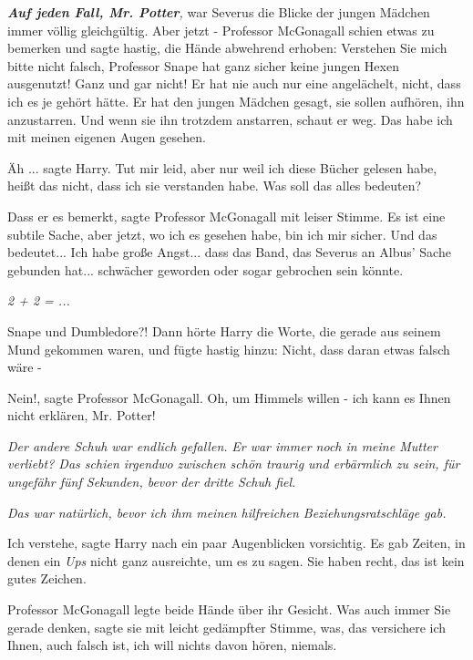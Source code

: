 \glqq{}\textbf{\emph{Auf jeden Fall, Mr. Potter}}\emph{,} war Severus die Blicke
der jungen Mädchen immer völlig gleichgültig. Aber jetzt -\grqq{} Professor
McGonagall schien etwas zu bemerken und sagte hastig, die Hände abwehrend
erhoben: \glqq{}Verstehen Sie mich bitte nicht falsch, Professor Snape hat ganz
sicher keine jungen Hexen ausgenutzt! Ganz und gar nicht! Er hat nie auch nur
eine angelächelt, nicht, dass ich es je gehört hätte. Er hat den jungen Mädchen
gesagt, sie sollen aufhören, ihn anzustarren. Und wenn sie ihn trotzdem
anstarren, schaut er weg. Das habe ich mit meinen eigenen Augen gesehen.\grqq{}

\glqq{}Äh ...\grqq{} sagte Harry. \glqq{}Tut mir leid, aber nur weil ich diese
Bücher gelesen habe, heißt das nicht, dass ich sie verstanden habe. Was soll das
alles bedeuten?\grqq{}

\glqq{}Dass er es bemerkt\grqq{}, sagte Professor McGonagall mit leiser Stimme.
\glqq{}Es ist eine subtile Sache, aber jetzt, wo ich es gesehen habe, bin ich mir
sicher. Und das bedeutet... Ich habe große Angst... dass das Band, das Severus
an Albus' Sache gebunden hat... schwächer geworden oder sogar gebrochen sein
könnte.\grqq{}

\emph{2 + 2 = ...}

\glqq{}Snape und Dumbledore?!\grqq{} Dann hörte Harry die Worte, die gerade aus
seinem Mund gekommen waren, und fügte hastig hinzu: \glqq{}Nicht, dass daran
etwas falsch wäre -\grqq{}

\glqq{}Nein!\grqq{}, sagte Professor McGonagall. \glqq{}Oh, um Himmels willen -
ich kann es Ihnen nicht erklären, Mr. Potter!\grqq{}

\emph{Der andere Schuh war endlich gefallen.}
\emph{Er war immer noch in meine Mutter verliebt? Das schien irgendwo zwischen
schön traurig und erbärmlich zu sein, für ungefähr fünf Sekunden, bevor der
dritte Schuh fiel.}

\emph{Das war natürlich, bevor ich ihm meinen hilfreichen Beziehungsratschläge
gab.}

\glqq{}Ich verstehe\grqq{}, sagte Harry nach ein paar Augenblicken vorsichtig. Es
gab Zeiten, in denen ein \glqq{}\emph{Ups}\grqq{} nicht ganz ausreichte, um es zu
sagen. \glqq{}Sie haben recht, das ist kein gutes Zeichen.\grqq{}

Professor McGonagall legte beide Hände über ihr Gesicht. \glqq{}Was auch immer
Sie gerade denken\grqq{}, sagte sie mit leicht gedämpfter Stimme, \glqq{}was, das
versichere ich Ihnen, auch falsch ist, ich will nichts davon hören,
niemals.\grqq{}

